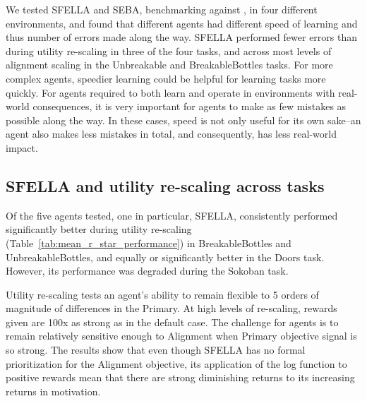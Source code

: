 


We tested SFELLA and SEBA, benchmarking against \tloA{}, in four different environments, and found that different agents had different speed of learning and thus number of errors made along the way. SFELLA performed fewer errors than \tloA{} during utility re-scaling in three of the four tasks, and across most levels of alignment scaling in the Unbreakable and BreakableBottles tasks. For more complex agents, speedier learning could be helpful for learning tasks more quickly. For agents required to both learn and operate in environments with real-world consequences, it is very important for agents to make as few mistakes as possible along the way. In these cases, speed is not only useful for its own sake--an agent also makes less mistakes in total, and consequently, has less real-world impact.

\subsection{SFELLA and utility re-scaling across tasks}

Of the five agents tested, one in particular, SFELLA, consistently performed significantly better during utility re-scaling (Table~\ref{tab:mean_r_star_performance}) in BreakableBottles and UnbreakableBottles, and equally or significantly better in the Doors task. However, its performance was degraded during the Sokoban task.

Utility re-scaling tests an agent's ability to remain flexible to 5 orders of magnitude of differences in the Primary. At high levels of re-scaling, rewards given are 100x as strong as in the default case. The challenge for agents is to remain relatively sensitive enough to Alignment when Primary objective signal is so strong. The results show that even though SFELLA has no formal prioritization for the Alignment objective, its application of the log function to positive rewards mean that there are strong diminishing returns to its increasing returns in motivation.

